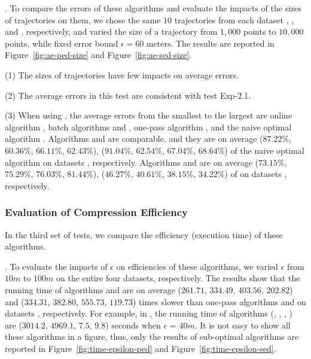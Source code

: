 .
To compare the errors of these algorithms and evaluate the impacts of the sizes of trajectories on them, we chose the same $10$ trajectories from each dataset \ucar, \geolife, \mopsi and \act, respectively,
and varied the size  of a trajectory from $1,000$ points to $10,000$ points, while fixed error bound $\epsilon = 60$ meters.
The results are reported in Figure~\ref{fig:ae-ped-size} and Figure~\ref{fig:ae-sed-size}.

\sstab (1) The sizes of trajectories have few impacts on average errors.

\sstab (2) The average errors in this test are consistent with test Exp-2.1.

\sstab (3) When using \sed, the average errors from the smallest
to the largest are online algorithm \squishe, batch algorithms \tpa and \dpa,
one-pass algorithm \cised, and the naive optimal algorithm \opt.
Algorithms \tpa and \dpa are comparable, and they are on average
{($87.22\%$, $60.36\%$, $66.11\%$, $62.43\%$), ($91.04\%$, $62.54\%$, $67.04\%$, $68.64\%$)} of the naive optimal algorithm \opt on datasets \dSets, respectively.
Algorithms \cised and \squishe are on average {($73.15\%$, $75.29\%$, $76.03\%$, $81.44\%$), ($46.27\%$, $40.61\%$, $38.15\%$, $34.22\%$)} of \opt on datasets \dSets, respectively.





\vspace{-1ex}
\subsubsection{Evaluation of Compression Efficiency}

In the third set of tests, we compare the efficiency (execution time) of these algorithms.


.
To evaluate the impacts of $\epsilon$ on efficiencies of these algorithms, we varied $\epsilon$ from $10m$ to $100m$ on the entire four datasets, respectively.
%
The results show that the running time of algorithms \optp and \nopts are on
average ($261.71$, $334.49$, $403.56$, $202.82$) and ($334.31$, $382.80$, $555.73$, $119.73$) times slower than one-pass algorithms \siped and \cised on datasets \dSets, respectively. 
For example, in \mopsi, the running time of algorithms
(\optp, \nopts, \siped, \cised) are  {($3014.2$, $4969.1$, $7.5$, $9.8$)} seconds when $\epsilon$ = $40m$.
%
It is not easy to show all these algorithms in a figure, thus, only the results of sub-optimal algorithms are reported in Figure~\ref{fig:time-epsilon-ped} and Figure~\ref{fig:time-epsilon-sed}.

